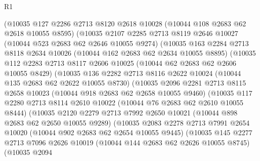 \begin{lexlean}{R1}
\begin{coremodule}
          (@10035
            @127
            @2286
            @2713
            @8120
            @2618
            @10028
            (@10044 @108 @2683 @62 @2618 @10055 @8595)
            (@10035
              @2107
              @2285
              @2713
              @8119
              @2646
              @10027
              (@10044 @523 @2683 @62 @2646 @10055 @9274)
              (@10035
                @163
                @2284
                @2713
                @8118
                @2634
                @10026
                (@10044 @162 @2683 @62 @2634 @10055 @8895)
                (@10035
                  @112
                  @2283
                  @2713
                  @8117
                  @2606
                  @10025
                  (@10044 @62 @2683 @62 @2606 @10055 @8429)
                  (@10035
                    @136
                    @2282
                    @2713
                    @8116
                    @2622
                    @10024
                    (@10044 @135 @2683 @62 @2622 @10055 @8730)
                    (@10035
                      @2096
                      @2281
                      @2713
                      @8115
                      @2658
                      @10023
                      (@10044 @918 @2683 @62 @2658 @10055 @9460)
                      (@10035
                        @117
                        @2280
                        @2713
                        @8114
                        @2610
                        @10022
                        (@10044 @76 @2683 @62 @2610 @10055 @8444)
                        (@10035
                          @2120
                          @2279
                          @2713
                          @7992
                          @2650
                          @10021
                          (@10044 @898 @2683 @62 @2650 @10055 @9289)
                          (@10035
                            @2083
                            @2278
                            @2713
                            @7991
                            @2654
                            @10020
                            (@10044 @902 @2683 @62 @2654 @10055 @9445)
                            (@10035
                              @145
                              @2277
                              @2713
                              @7096
                              @2626
                              @10019
                              (@10044 @144 @2683 @62 @2626 @10055 @8745)
                              (@10035
                                @2094

\end{coremodule}
\end{lexlean}
